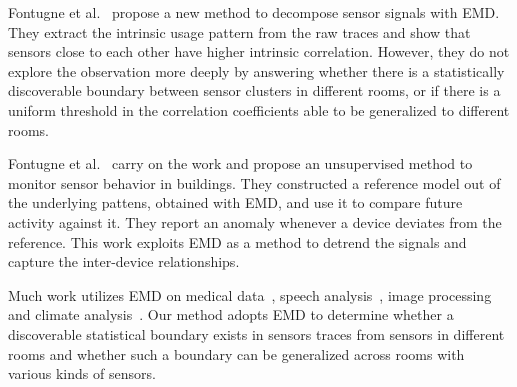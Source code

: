 Fontugne et al.~\cite{romain:iotapp12} propose a new method to decompose sensor signals with EMD.
They extract the intrinsic usage pattern from the raw traces and show that sensors close to each other have higher intrinsic correlation. However, they do not explore the observation more deeply by answering whether there is a statistically discoverable boundary between sensor clusters in different rooms, or if there is a uniform threshold in the correlation coefficients able to be generalized to different rooms.

Fontugne et al.~\cite{SBS} carry on the work and propose an unsupervised method to monitor sensor behavior in buildings. They constructed 
a reference model out of the underlying pattens, obtained with EMD,  and use it to compare future activity against it.  They report an anomaly whenever a device deviates from the reference. This work exploits EMD as a method to detrend the signals and capture the inter-device relationships.

Much work utilizes EMD on medical data~\cite{ecg}, speech analysis~\cite{huang:signalProc2006}, image processing~\cite{ip} 
and climate analysis~\cite{climate}. Our method adopts EMD to determine whether a discoverable statistical boundary exists in sensors traces
from sensors in different rooms and whether such a boundary
 can be generalized across rooms with various kinds of sensors.